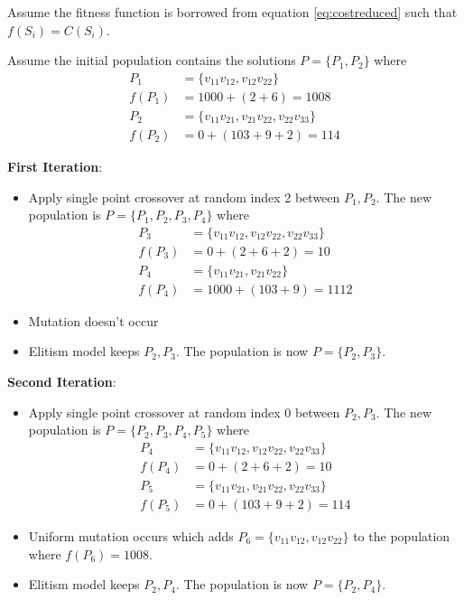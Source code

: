 \documentclass[conference]{IEEEtran}
\begin{document}
Assume the fitness function is borrowed from equation \ref{eq:costreduced} such that $f(S_i) = C(S_i)$.

Assume the initial population contains the solutions $P = \{ P_1, P_2 \}$ where
\begin{align*}
P_1 &= \{ v_{11}v_{12}, v_{12}v_{22} \} \\
f(P_1) &= 1000 + (2 + 6) = 1008 \\
P_2 &= \{ v_{11}v_{21}, v_{21}v_{22}, v_{22}v_{33} \} \\
f(P_2) &= 0 + (103 + 9 + 2) = 114
\end{align*}

\textbf{First Iteration}:
\begin{itemize}
\item Apply single point crossover at random index 2 between $P_1, P_2$. The new population is $P = \{ P_1, P_2, P_3, P_4 \}$ where
\begin{align*}
P_3 &= \{ v_{11}v_{12}, v_{12}v_{22}, v_{22}v_{33} \} \\
f(P_3) &= 0 + (2 + 6 + 2) = 10 \\
P_4 &= \{ v_{11}v_{21}, v_{21}v_{22} \} \\
f(P_4) &= 1000 + (103 + 9) = 1112
\end{align*}

\item Mutation doesn't occur

\item Elitism model keeps $P_2, P_3$. The population is now $P = \{ P_2, P_3 \}$.
\end{itemize}

\textbf{Second Iteration}:
\begin{itemize}
\item Apply single point crossover at random index 0 between $P_2, P_3$. The new population is $P = \{ P_2, P_3, P_4, P_5 \}$ where
\begin{align*}
P_4 &= \{ v_{11}v_{12}, v_{12}v_{22}, v_{22}v_{33} \} \\
f(P_4) &= 0 + (2 + 6 + 2) = 10 \\
P_5 &= \{ v_{11}v_{21}, v_{21}v_{22}, v_{22}v_{33} \} \\
f(P_5) &= 0 + (103 + 9 + 2) = 114
\end{align*}

\item Uniform mutation occurs which adds $P_6 = \{ v_{11}v_{12}, v_{12}v_{22} \}$ to the population where $f(P_6) = 1008$.

\item Elitism model keeps $P_2, P_4$. The population is now $P = \{ P_2, P_4 \}$.
\end{itemize}
\end{document}
